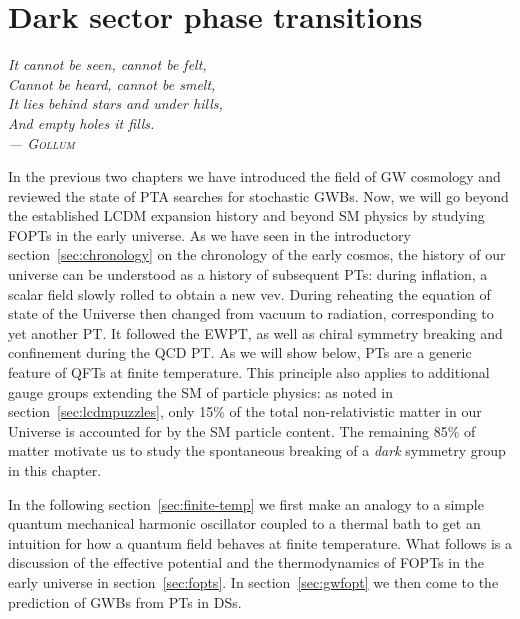 \chapter{Dark sector phase transitions} \label{chp:pt}

\begin{flushright}
	\slshape
	It cannot be seen, cannot be felt,\\
	Cannot be heard, cannot be smelt,\\
	It lies behind stars and under hills,\\
	And empty holes it fills.\\ \medskip
	--- \textsc{Gollum}
\end{flushright}



In the previous two chapters we have introduced the field of \ac{GW} cosmology and reviewed the state of \ac{PTA} searches for stochastic \acp{GWB}. Now, we will go beyond the established  \ac{LCDM} expansion history and beyond \ac{SM} physics by studying \acp{FOPT} in the early universe. As we have seen in the introductory section~\ref{sec:chronology} on the chronology of the early cosmos, the history of our universe can be understood as a history of subsequent \acp{PT}:  during inflation, a scalar field slowly rolled to obtain a new \ac{vev}. During reheating the equation of state of the Universe then changed from vacuum to radiation, corresponding to yet another \ac{PT}. It followed the \ac{EWPT}, as well as chiral symmetry breaking and confinement during the \ac{QCD} \ac{PT}. As we will show below, \acp{PT} are a generic feature of \acp{QFT} at finite temperature. This principle also applies to additional gauge groups extending the \ac{SM} of particle physics: as noted in section~\ref{sec:lcdmpuzzles}, only 15\% of the total non-relativistic matter in our Universe is accounted for by the \ac{SM} particle content. The remaining 85\% of matter motivate us to study the spontaneous breaking of a \textit{dark} symmetry group in this chapter.

In the following section~\ref{sec:finite-temp} we first make an analogy to a simple quantum mechanical harmonic oscillator coupled to a thermal bath to get an intuition for how a quantum field behaves at finite temperature.  What follows is a discussion of the effective potential and the thermodynamics of \acp{FOPT} in the early universe in section~\ref{sec:fopts}. In section~\ref{sec:gwfopt} we then come to the prediction of \acp{GWB} from \acp{PT} in \acp{DS}.

